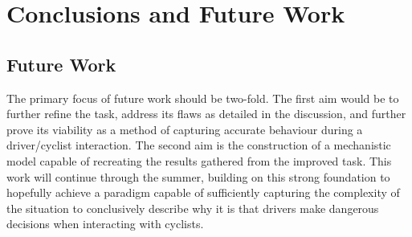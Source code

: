 \chapter[Conclusions]{Conclusions and Future Work}

\section{Future Work}
The primary focus of future work should be two-fold. The first aim would be to further refine the task, address its flaws as detailed in the discussion, and further prove its viability as a method of capturing accurate behaviour during a driver/cyclist interaction. The second aim is the construction of a mechanistic model capable of recreating the results gathered from the improved task. This work will continue through the summer, building on this strong foundation to hopefully achieve a paradigm capable of sufficiently capturing the complexity of the situation to conclusively describe why it is that drivers make dangerous decisions when interacting with cyclists.